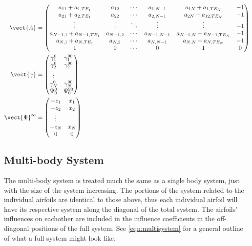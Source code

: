 \begin{align}
	\vect{A} &= \begin{pmatrix}
		a_{11}+a_{1,TE_1} & a_{12} &  \cdots  & a_{1,N-1} & a_{1N}+a_{1,TE_N} & -1 \\
		a_{21}+a_{2,TE_1} & a_{22} & \cdots & a_{2,N-1} & a_{2N}+a_{12,TE_N} & -1 \\
		\vdots & \vdots &  \ddots &  \vdots & \vdots & -1 \\
		a_{N-1,1}+a_{N-1,TE_1} & a_{N-1,2} &  \cdots & a_{N-1,N-1} & a_{N-1,N}+a_{N-1,TE_N} & -1 \\
		a_{N,1}+a_{N,TE_1} & a_{N,2} & \cdots & a_{N,N-1} & a_{N,N}+a_{N,TE_N} & -1 \\
		1 & 0 & \cdots  & 0 & 1 & 0
	\end{pmatrix} \\
	\vect{\gamma} &= 	\begin{pmatrix}
		\gamma^0_1 & \gamma^{90}_1 \\
		\gamma^0_2 & \gamma^{90}_2 \\
		\vdots \\
		\gamma^0_N & \gamma^{90}_N \\
		\Psi^0_0 & \Psi^{90}_0\\
	\end{pmatrix} \\
	\vect{\Psi}^\infty &= 
	\begin{pmatrix}
		-z_1 & x_1 \\
		-z_2 & x_2 \\
		\vdots \\
		-z_N & x_N \\
		0 & 0
	\end{pmatrix}
\end{align}


\subsection{Multi-body System}

The multi-body system is treated much the same as a single body system, just with the size of the system increasing.
The portions of the system related to the individual airfoils are identical to those above, thus each individual airfoil will have its respective system along the diagonal of the total system.
The airfoils' influences on eachother are included in the influence coefficients in the off-diagonal positions of the full system.
See \cref{eqn:multisystem} for a general outline of what a full system might look like.


